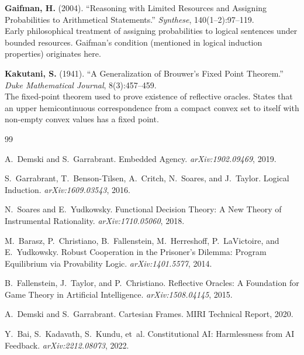 \documentclass[11pt,a4paper]{article}
\theoremstyle{definition}
\theoremstyle{remark}
\begin{document}
\begin{enumerate}[label={[\arabic*]},leftmargin=2em]
\item \label{bib:gaifman2004} \textbf{Gaifman, H.} (2004). ``Reasoning
  with Limited Resources and Assigning Probabilities to Arithmetical
  Statements.'' \textit{Synthese}, 140(1--2):97--119.\\
  Early philosophical treatment of assigning probabilities to logical
  sentences under bounded resources.  Gaifman's condition (mentioned in
  logical induction properties) originates here.

\item \label{bib:kakutani1941} \textbf{Kakutani, S.} (1941). ``A
  Generalization of Brouwer's Fixed Point Theorem.'' \textit{Duke
  Mathematical Journal}, 8(3):457--459.\\
  The fixed-point theorem used to prove existence of reflective oracles.
  States that an upper hemicontinuous correspondence from a compact
  convex set to itself with non-empty convex values has a fixed point.

\end{enumerate}

\begin{thebibliography}{99}

A.~Demski and S.~Garrabrant.
\newblock Embedded Agency.
\newblock \textit{arXiv:1902.09469}, 2019.

S.~Garrabrant, T.~Benson-Tilsen, A.~Critch, N.~Soares, and J.~Taylor.
\newblock Logical Induction.
\newblock \textit{arXiv:1609.03543}, 2016.

N.~Soares and E.~Yudkowsky.
\newblock Functional Decision Theory: A New Theory of Instrumental
  Rationality.
\newblock \textit{arXiv:1710.05060}, 2018.

M.~Barasz, P.~Christiano, B.~Fallenstein, M.~Herreshoff, P.~LaVictoire, and
  E.~Yudkowsky.
\newblock Robust Cooperation in the Prisoner's Dilemma: Program Equilibrium
  via Provability Logic.
\newblock \textit{arXiv:1401.5577}, 2014.

B.~Fallenstein, J.~Taylor, and P.~Christiano.
\newblock Reflective Oracles: A Foundation for Game Theory in Artificial
  Intelligence.
\newblock \textit{arXiv:1508.04145}, 2015.

A.~Demski and S.~Garrabrant.
\newblock Cartesian Frames.
\newblock MIRI Technical Report, 2020.

Y.~Bai, S.~Kadavath, S.~Kundu, et~al.
\newblock Constitutional AI: Harmlessness from AI Feedback.
\newblock \textit{arXiv:2212.08073}, 2022.

\end{thebibliography}
\end{document}

